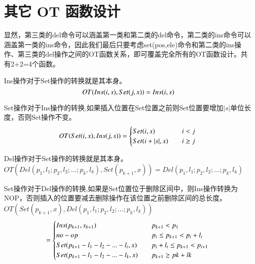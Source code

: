 \section{其它 OT 函数设计}
\par 显然，第三类的del命令可以涵盖第一类和第二类的del命令，第二类的ins命令可以涵盖第一类的ins命令，因此我们最后只要考虑set(pos,ele)命令和第二类的ins操作、第三类的del操作之间的OT函数关系，即可覆盖完全所有的OT函数设计。共有2+2=4个函数。

\par Ins操作对于Set操作的转换就是其本身。\\
\begin{equation}
OT(Ins(i,s),Set(j,x))= Ins(i,s)\\
\end{equation}

\par Set操作对于Ins操作的转换,如果插入位置在Set位置之前则Set位置要增加$|s|$单位长度，否则Set操作不变。\\
\begin{equation}
OT(Set(i,x),Ins(j,s))= \begin{cases}
{Set(i,x)}  \quad & i<j \\
{Set(i+|s|,x)} \quad  &i \ge j \end{cases} \\
\end{equation}

\par Del操作对于Set操作的转换就是其本身。\\
$OT(Del(p_1,l_1;p_2,l_2;...;p_k,l_k),Set(p_{k+1},x)) = Del(p_1,l_1;p_2,l_2;...;p_k,l_k)$\\

\par Set操作对于Del操作的转换,如果是Set位置位于删除区间中，则Ins操作转换为NOP，否则插入的位置要减去删除操作在该位置之前删除区间的总长度。\\
$OT(Set(p_{k+1},x),Del(p_1,l_1;p_2,l_2;...;p_k,l_k))$
\begin{equation}
= \begin{cases}
Ins(p_{k+1},s_{k+1}) \quad & p_{k+1} < p_1 \\
no-op \quad & p_i \le p_{k+1} < p_i+l_i\\
Set(p_{k+1}-l_1-l_2-...-l_i,x) \quad & p_i+l_i \le p_{k+1} < p_{i+1}\\
Set(p_{k+1}-l_1-l_2-...-l_k,x) \quad & p_{k+1} \ge pk+lk \end{cases}\\
\end{equation}